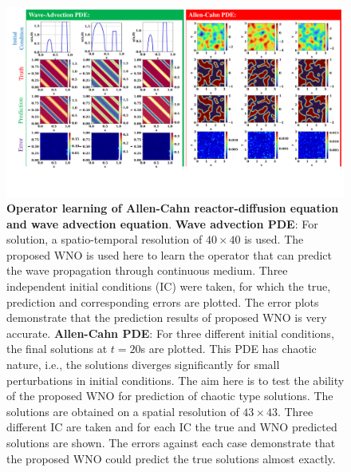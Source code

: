 \documentclass{article}
\begin{document}
\begin{figure}[ht!]
	\centering
	\includegraphics[width=\textwidth]{Results2.pdf}
	\caption{\textbf{Operator learning of Allen-Cahn reactor-diffusion equation and wave advection equation}. \textbf{Wave advection PDE}: For solution, a spatio-temporal resolution of $40 \times 40$ is used. The proposed WNO is used here to learn the operator that can predict the wave propagation through continuous medium. Three independent initial conditions (IC) were taken, for which the true, prediction and corresponding errors are plotted. The error plots demonstrate that the prediction results of proposed WNO is very accurate. \textbf{Allen-Cahn PDE}: For three different initial conditions, the final solutions at $t=20$s are plotted. This PDE has chaotic nature, i.e., the solutions diverges significantly for small perturbations in initial conditions. The aim here is to test the ability of the proposed WNO for prediction of chaotic type solutions. The solutions are obtained on a spatial resolution of $43 \times 43$. Three different IC are taken and for each IC the true and WNO predicted solutions are shown. The errors against each case demonstrate that the proposed WNO could predict the true solutions almost exactly.}
	\label{fig_acandav}
\end{figure}
\end{document}
